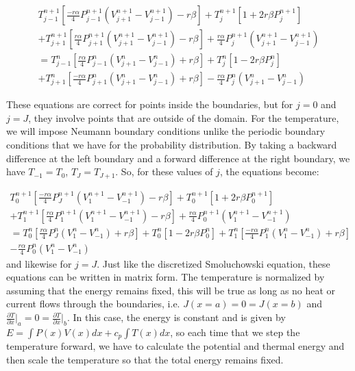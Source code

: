 \begin{multline}
T_{j-1}^{n+1} \left [\frac{-r \alpha}{4}P_{j-1}^{n+1}(V_{j+1}^{n+1} - V_{j-1}^{n+1}) - r \beta \right]
+ T_j^{n+1} \left[1 + 2 r \beta P_j^{n+1} \right] \\
+T_{j+1}^{n+1} \left [\frac{r \alpha}{4} P_{j+1}^{n+1}(V_{j+1}^{n+1} - V_{j-1}^{n+1}) - r \beta \right]
+\frac{r \alpha}{4} P_{j}^{n+1} \left(V_{j+1}^{n+1} - V_{j-1}^{n+1} \right) \\
 = T_{j-1}^{n} \left [\frac{r \alpha}{4}P_{j-1}^{n}(V_{j+1}^{n} - V_{j-1}^{n}) + r \beta \right ] + T_j^{n} \left[1 - 2 r \beta P_j^{n} \right] \\
+T_{j+1}^{n} \left [\frac{-r \alpha}{4} P_{j+1}^{n}(V_{j+1}^{n} - V_{j-1}^{n}) + r \beta \right]
-\frac{r \alpha}{4} P_{j}^{n} \left(V_{j+1}^{n} - V_{j-1}^{n} \right)
\end{multline}

These equations are correct for points inside the boundaries, but for $j = 0$ and $j = J$, they involve points that are outside of the domain. For the temperature, we will impose Neumann boundary conditions unlike the periodic boundary conditions that we have for the probability distribution. By taking a backward difference at the left boundary and a forward difference at the right boundary, we have $T_{-1} = T_0$, $T_J = T_{J+1}$. So, for these values of $j$, the equations become:

\begin{multline}
T_0^{n+1} \left [\frac{-r \alpha}{4}P_J^{n+1}(V_1^{n+1} - V_{-1}^{n+1}) - r \beta \right] + T_0^{n+1} \left[1 + 2 r \beta P_0^{n+1} \right] \\
+T_{1}^{n+1} \left [\frac{r \alpha}{4} P_{1}^{n+1}(V_{1}^{n+1} - V_{-1}^{n+1}) - r \beta \right]
+\frac{r \alpha}{4} P_{0}^{n+1} \left(V_{1}^{n+1} - V_{-1}^{n+1} \right) \\
 = T_{0}^{n} \left [\frac{r \alpha}{4}P_{J}^{n}(V_{1}^{n} - V_{-1}^{n}) + r \beta \right ] + T_0^{n} \left[1 - 2 r \beta P_0^{n} \right]
+T_{1}^{n} \left [\frac{-r \alpha}{4} P_{1}^{n}(V_{1}^{n} - V_{-1}^{n}) + r \beta \right] \\
-\frac{r \alpha}{4} P_{0}^{n} \left(V_{1}^{n} - V_{-1}^{n} \right)
\end{multline}
and likewise for $j = J$. Just like the discretized Smoluchowski equation, these equations can be written in matrix form. The temperature is normalized by assuming that the energy remains fixed, this will be true as long as no heat or current flows through the boundaries, i.e. $J(x = a) = 0 = J(x = b)$ and $\frac{\partial T}{\partial x} \rvert_a = 0 = \frac{\partial T}{\partial x} \rvert_b$. In this case, the energy is constant and is given by $E = \int P(x) V(x) dx + c_p \int T(x) dx$, so each time that we step the temperature forward, we have to calculate the potential and thermal energy and then scale the temperature so that the total energy remains fixed.


